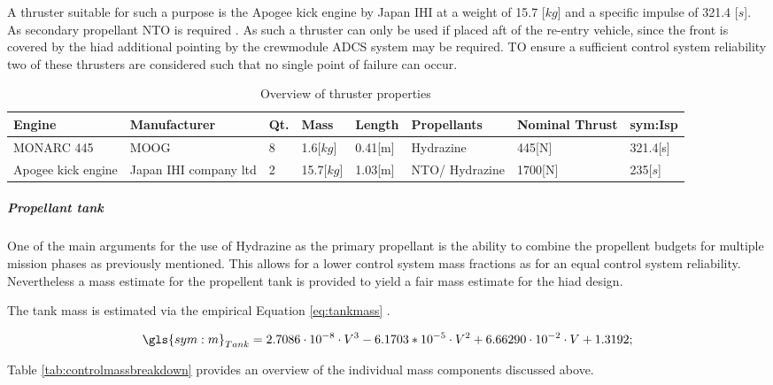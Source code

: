 A thruster suitable for such a purpose is the Apogee kick engine by Japan IHI at a weight of 15.7 [$kg$] and a specific impulse of 321.4 [$s$]. As secondary propellant NTO is required \cite[p.538]{Wertz2011}. As such a thruster can only be used if placed aft of the re-entry vehicle, since the front is covered by the \gls{hiad} additional pointing by the crewmodule ADCS system may be required. TO ensure a sufficient control system reliability two of these thrusters are considered such that no single point of failure can occur. 

\begin{table}[h]
\centering
\caption{Overview of thruster properties}
\label{tab:thrusters}
\begin{tabular}{|p{}|p{}|l|l|l|p{}|p{}|l|} \hline \hline
Engine              & Manufacturer          & Qt. & Mass       & Length  & Propellants   & Nominal Thrust & \gls{sym:Isp} \\ \hline
MONARC 445          & MOOG                  & 8        & 1.6[$kg$]  & 0.41[m] & Hydrazine     & 445[N]         & 321.4[s]      \\ \hline
Apogee kick engine & Japan IHI company ltd & 2        & 15.7[$kg$] & 1.03[m] & NTO/ Hydrazine & 1700[N]        & 235[$s$]     \\ \hline
\end{tabular}
\end{table}


\subparagraph{Propellant tank}

One of the main arguments for the use of Hydrazine as the primary propellant is the ability to combine the propellent budgets for multiple mission phases as previously mentioned. This allows for a lower control system mass fractions as for an equal control system reliability. Nevertheless a mass estimate for the propellent tank is provided to yield a fair mass estimate for the \gls{hiad} design. 

The tank mass is estimated via the empirical Equation \ref{eq:tankmass} \cite[p. 543]{Wertz2011}.

\begin{equation}
\label{eq:tankmass} 
\gls{sym:m}_{Tank}=2.7086 \cdot 10^{-8} \cdot V^3 -6.1703*10^{-5} \cdot V^2 +6.66290 \cdot 10^{-2}  \cdot V +1.3192;
\end{equation}


Table \ref{tab:controlmassbreakdown} provides an overview of the individual mass components discussed above. 

